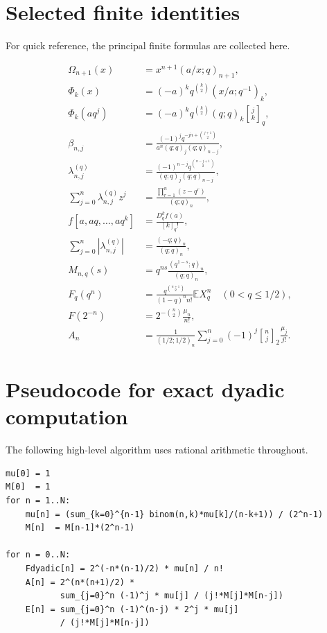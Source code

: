 \documentclass[11pt,a4paper,oneside]{article}
\theoremstyle{definition}
\theoremstyle{remark}
\newcommand{\E}{\mathbb E}
\newcommand{\qbinom}[3]{\genfrac{[}{]}{0pt}{}{#1}{#2}_{#3}}
\begin{document}
\section{Selected finite identities}
\label{app:finite-identities}

For quick reference, the principal finite formulas are collected here.

\begin{align*}
 \Omega_{n+1}(x)
 &=x^{n+1}(a/x;q)_{n+1},\\[0.3em]
 \Phi_k(x)
 &=(-a)^kq^{\binom k2}(x/a;q^{-1})_k,\\[0.3em]
 \Phi_k(aq^j)
 &=(-a)^kq^{\binom k2}(q;q)_k\qbinom jkq,\\[0.3em]
 \beta_{n,j}
 &=\frac{(-1)^jq^{-jn+\binom{j+1}{2}}}
 {a^n(q;q)_j(q;q)_{n-j}},\\[0.3em]
 \lambda_{n,j}^{(q)}
 &=\frac{(-1)^{n-j}q^{\binom{n-j+1}{2}}}
 {(q;q)_j(q;q)_{n-j}},\\[0.3em]
 \sum_{j=0}^n\lambda_{n,j}^{(q)}z^j
 &=\frac{\prod_{r=1}^n(z-q^r)}{(q;q)_n},\\[0.3em]
 f[a,aq,\ldots,aq^k]
 &=\frac{D_q^kf(a)}{[k]_q!},\\[0.3em]
 \sum_{j=0}^n|\lambda_{n,j}^{(q)}|
 &=\frac{(-q;q)_n}{(q;q)_n},\\[0.3em]
 M_{n,q}(s)
 &=q^{ns}\frac{(q^{1-s};q)_n}{(q;q)_n},\\[0.3em]
 F_q(q^n)
 &=\frac{q^{\binom{n+1}{2}}}{(1-q)^nn!}\E X_q^n
 \quad(0<q\le1/2),\\[0.3em]
 F(2^{-n})
 &=2^{-\binom n2}\frac{\mu_n}{n!},\\[0.3em]
 A_n
 &=\frac1{(1/2;1/2)_n}
 \sum_{j=0}^n(-1)^j\qbinom nj2\frac{\mu_j}{j!}.
\end{align*}

\section{Pseudocode for exact dyadic computation}
\label{app:pseudocode}

The following high-level algorithm uses rational arithmetic throughout.

\begin{lstlisting}[style=pythonstyle]
mu[0] = 1
M[0]  = 1
for n = 1..N:
    mu[n] = (sum_{k=0}^{n-1} binom(n,k)*mu[k]/(n-k+1)) / (2^n-1)
    M[n]  = M[n-1]*(2^n-1)

for n = 0..N:
    Fdyadic[n] = 2^(-n*(n-1)/2) * mu[n] / n!
    A[n] = 2^(n*(n+1)/2) *
           sum_{j=0}^n (-1)^j * mu[j] / (j!*M[j]*M[n-j])
    E[n] = sum_{j=0}^n (-1)^(n-j) * 2^j * mu[j]
           / (j!*M[j]*M[n-j])
\end{lstlisting}
\end{document}
